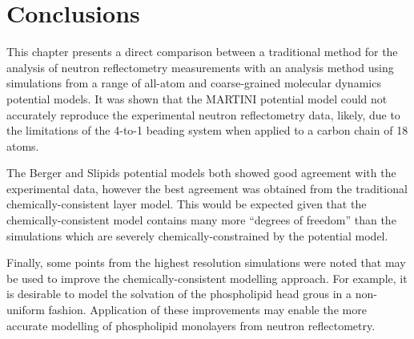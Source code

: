 \section{Conclusions}

This chapter presents a direct comparison between a traditional method for the analysis of neutron reflectometry measurements with an analysis method using simulations from a range of all-atom and coarse-grained molecular dynamics potential models.
It was shown that the MARTINI potential model could not accurately reproduce the experimental neutron reflectometry data, likely, due to the limitations of the 4-to-1 beading system when applied to a carbon chain of 18 atoms.

The Berger and Slipids potential models both showed good agreement with the experimental data, however the best agreement was obtained from the traditional chemically-consistent layer model.
This would be expected given that the chemically-consistent model contains many more ``degrees of freedom'' than the simulations which are severely chemically-constrained by the potential model.

Finally, some points from the highest resolution simulations were noted that may be used to improve the chemically-consistent modelling approach.
For example, it is desirable to model the solvation of the phospholipid head grous in a non-uniform fashion.
Application of these improvements may enable the more accurate modelling of phospholipid monolayers from neutron reflectometry. 
